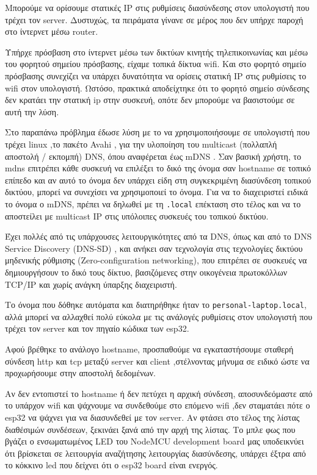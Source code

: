 Μπορούμε να ορίσουμε στατικές IP στις ρυθμίσεις διασύνδεσης στον υπολογιστή που τρέχει τον server.
Δυστυχώς, τα πειράματα γίνανε σε μέρος που δεν υπήρχε παροχή στο ίντερνετ μέσω router.

Υπήρχε πρόσβαση στο ίντερνετ μέσω των δικτύων κινητής τηλεπικοινωνίας και μέσω του φορητού σημείου πρόσβασης, είχαμε τοπικά δίκτυα wifi. 
Και στο φορητό σημείο πρόσβασης συνεχίζει να υπάρχει δυνατότητα να ορίσεις στατική IP στις ρυθμίσεις το wifi στον υπολογιστή.
Ωστόσο, πρακτικά αποδείχτηκε ότι το φορητό σημείο σύνδεσης δεν κρατάει την στατική ip στην συσκευή, οπότε δεν μπορούμε να βασιστούμε σε αυτή την λύση.

Στο παραπάνω πρόβλημα έδωσε λύση με το να χρησιμοποιήσουμε σε υπολογιστή που τρέχει linux ,το πακέτο Avahi \cite{avahi},
για την υλοποίηση του multicast (πολλαπλή αποστολή / εκπομπή) DNS, όπου αναφέρεται έως mDNS \cite{mDNS}. 
Σαν βασική χρήστη, το mdns επιτρέπει κάθε συσκευή να επιλέξει το δικό της όνομα σαν hostname σε τοπικό επίπεδο και αν αυτό το όνομα δεν υπάρχει είδη στη συγκεκριμένη διασύνδεση τοπικού δικτύου,
μπορεί να συνεχίσει να χρησιμοποιεί το όνομα.
Για να το διαχειριστεί ειδικά το όνομα ο mDNS, πρέπει να δηλωθεί με τη \texttt{.local} επέκταση στο τέλος και να το αποστείλει με multicast IP στις υπόλοιπες συσκευές του τοπικού δικτύου.

Έχει πολλές από τις υπάρχουσες λειτουργικότητες από τα DNS, όπως και από το DNS Service Discovery (DNS-SD) \cite{DNSsd},
και ανήκει σαν τεχνολογία στις τεχνολογίες δικτύου μηδενικής ρύθμισης (Zero-configuration networking), που επιτρέπει σε συσκευές να δημιουργήσουν το δικό τους δίκτυο,
βασιζόμενες στην οικογένεια πρωτοκόλλων TCP/IP και χωρίς ανάγκη ύπαρξης διαχειριστή.

Το όνομα που δόθηκε αυτόματα και διατηρήθηκε ήταν το \texttt{personal-laptop.local}, 
αλλά μπορεί να αλλαχθεί πολύ εύκολα με τις ανάλογές ρυθμίσεις στον υπολογιστή που τρέχει τον server και τον πηγαίο κώδικα των esp32.

Αφού βρέθηκε το ανάλογο hostname, προσπαθούμε να εγκαταστήσουμε σταθερή σύνδεση http και tcp μεταξύ  server και client ,στέλνοντας μήνυμα σε ειδικό ώστε να προχωρήσουμε στην αποστολή δεδομένων.

Αν δεν εντοπιστεί το hostname ή δεν πετύχει η αρχική σύνδεση, αποσυνδεόμαστε από το υπάρχον wifi και ψάχνουμε να συνδεθούμε στο επόμενο wifi ,δεν σταματάει πότε ο esp32 να ψάχνει για να διασυνδεθεί με τον server. 
Αν φτάσει στο τέλος της λίστας διαθέσιμών συνδέσεων, ξεκινάει ξανά από την αρχή της λίστας. 
Το μπλε φως που βγάζει ο ενσωματωμένος LED του NodeMCU development board μας υποδεικνύει ότι βρίσκεται σε λειτουργία αναζήτησης λειτουργίας διασύνδεσης, υπάρχει έξτρα από το κόκκινο led που δείχνει ότι ο esp32 board είναι ενεργός.
